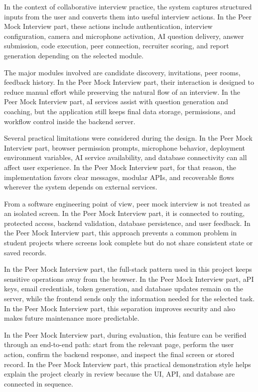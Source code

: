\documentclass[12pt,a4paper]{report}
\begin{document}
In the context of collaborative interview practice, the system captures structured inputs from the user and converts them into useful interview actions. In the Peer Mock Interview part, these actions include authentication, interview configuration, camera and microphone activation, AI question delivery, answer submission, code execution, peer connection, recruiter scoring, and report generation depending on the selected module.


The major modules involved are candidate discovery, invitations, peer rooms, feedback history. In the Peer Mock Interview part, their interaction is designed to reduce manual effort while preserving the natural flow of an interview. In the Peer Mock Interview part, aI services assist with question generation and coaching, but the application still keeps final data storage, permissions, and workflow control inside the backend server.


Several practical limitations were considered during the design. In the Peer Mock Interview part, browser permission prompts, microphone behavior, deployment environment variables, AI service availability, and database connectivity can all affect user experience. In the Peer Mock Interview part, for that reason, the implementation favors clear messages, modular APIs, and recoverable flows wherever the system depends on external services.


From a software engineering point of view, peer mock interview is not treated as an isolated screen. In the Peer Mock Interview part, it is connected to routing, protected access, backend validation, database persistence, and user feedback. In the Peer Mock Interview part, this approach prevents a common problem in student projects where screens look complete but do not share consistent state or saved records.


In the Peer Mock Interview part, the full-stack pattern used in this project keeps sensitive operations away from the browser. In the Peer Mock Interview part, aPI keys, email credentials, token generation, and database updates remain on the server, while the frontend sends only the information needed for the selected task. In the Peer Mock Interview part, this separation improves security and also makes future maintenance more predictable.


In the Peer Mock Interview part, during evaluation, this feature can be verified through an end-to-end path: start from the relevant page, perform the user action, confirm the backend response, and inspect the final screen or stored record. In the Peer Mock Interview part, this practical demonstration style helps explain the project clearly in review because the UI, API, and database are connected in sequence.
\end{document}
